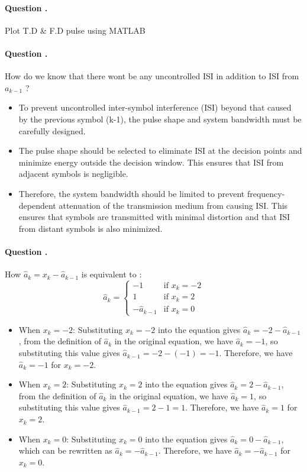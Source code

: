 \documentclass[14pt,a4paper]{report}
\newcounter{question}
\newcommand*\question{%
\stepcounter{question}%
\paragraph{Question \thesection.\thequestion}}
\begin{document}
\question
{
    Plot T.D \& F.D pulse using MATLAB
}
\begin{answer_box*}
\end{answer_box*}
\question
{
    How do we know that there wont be any uncontrolled ISI in addition to ISI from $a_{k-1}$ ?
}
\begin{answer_box*}
    \begin{itemize}
        \item To prevent uncontrolled inter-symbol interference (ISI) beyond that caused by the previous symbol (k-1), the pulse shape and system bandwidth must be carefully designed.

        \item The pulse shape should be selected to eliminate ISI at the decision points and minimize energy outside the decision window. This ensures that ISI from adjacent symbols is negligible.
        
        \item Therefore, the system bandwidth should be limited to prevent frequency-dependent attenuation of the transmission medium from causing ISI. This ensures that symbols are transmitted with minimal distortion and that ISI from distant symbols is also minimized.
    \end{itemize}
\end{answer_box*}
\question
{
    How $\hat{a}_k = x_k - \hat{a}_{k-1}$ is equivalent to :    
\begin{equation}
    \hat{a}_k =
    \begin{cases}
        -1             &\text{if } x_k = -2 \\
        1              &\text{if } x_k =  2 \\
        -\hat{a}_{k-1} &\text{if } x_k =  0
    \end{cases}
\end{equation}

    
}
\begin{answer_box*}
\begin{itemize}
    \item  When $x_k = -2$: Substituting $x_k = -2$ into the equation gives $\hat{a}_k = -2 - \hat{a}_{k-1}$, from the definition of $\hat{a}_k$ in the original equation, we have $\hat{a}_k = -1$, so substituting this value gives $\hat{a}_{k-1} = -2 - (-1) = -1$. Therefore, we have $\hat{a}_k = -1$ for $x_k = -2$.
    \item  When $x_k = 2$: Substituting $x_k = 2$ into the equation gives $\hat{a}_k = 2 - \hat{a}_{k-1}$, from the definition of $\hat{a}_k$ in the original equation, we have $\hat{a}_k = 1$, so substituting this value gives $\hat{a}_{k-1} = 2 - 1 = 1$. Therefore, we have $\hat{a}_k = 1$ for $x_k = 2$.
    \item When $x_k = 0$: Substituting $x_k = 0$ into the equation gives $\hat{a}_k = 0 - \hat{a}_{k-1}$, which can be rewritten as $\hat{a}_k = -\hat{a}_{k-1}$. Therefore, we have $\hat{a}_k = -\hat{a}_{k-1}$ for $x_k = 0$.  
\end{itemize}
\end{answer_box*}
\end{document}

